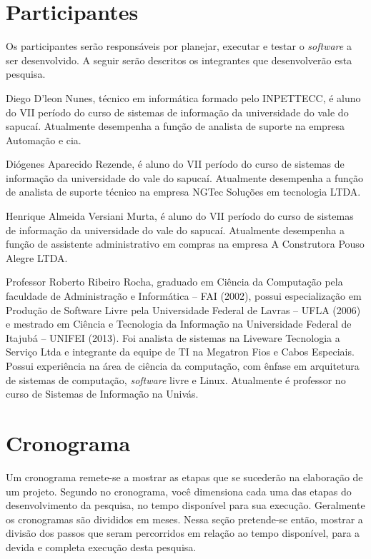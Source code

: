 \section{Participantes}

	\par Os participantes serão responsáveis por planejar, executar e testar o
\textit{software} a ser desenvolvido. A seguir serão descritos os integrantes
que desenvolverão esta pesquisa.

	\par Diego D’leon Nunes, técnico em informática formado pelo INPETTECC, é aluno
do VII período do curso de sistemas de informação da universidade do vale do
sapucaí. Atualmente desempenha a função de analista de suporte na empresa
Automação e cia.

	\par Diógenes Aparecido Rezende, é aluno do VII período do curso de sistemas de
informação da universidade do vale do sapucaí. Atualmente desempenha a função de 
analista de suporte técnico na empresa NGTec Soluções em tecnologia LTDA.

	\par Henrique Almeida Versiani Murta, é aluno do VII período do curso de
sistemas de informação da universidade do vale do sapucaí. Atualmente
desempenha a função de assistente administrativo em compras na empresa A
Construtora Pouso Alegre LTDA.

	\par Professor Roberto Ribeiro Rocha, graduado em Ciência da Computação pela
faculdade de Administração e Informática – FAI (2002), possui especialização em
Produção de Software Livre pela Universidade Federal de Lavras – UFLA (2006) e
mestrado em Ciência e Tecnologia da Informação na Universidade Federal de
Itajubá – UNIFEI (2013). Foi analista de sistemas na Liveware Tecnologia a
Serviço Ltda e integrante da equipe de TI na Megatron Fios e Cabos Especiais.
Possui experiência na área de ciência da computação, com ênfase em arquitetura
de sistemas de computação, \textit{software} livre e Linux. Atualmente é
professor no curso de Sistemas de Informação na Univás.
\pagebreak
\section{Cronograma}

	\par Um cronograma remete-se a mostrar as etapas que se sucederão na
elaboração de um projeto. Segundo  no cronograma, você
dimensiona cada uma das etapas do desenvolvimento da pesquisa, no tempo
disponível para sua execução. Geralmente os cronogramas são divididos em meses.
Nessa seção pretende-se então, mostrar a divisão dos passos que seram
percorridos em relação ao tempo disponível, para a devida e completa execução
desta pesquisa.

